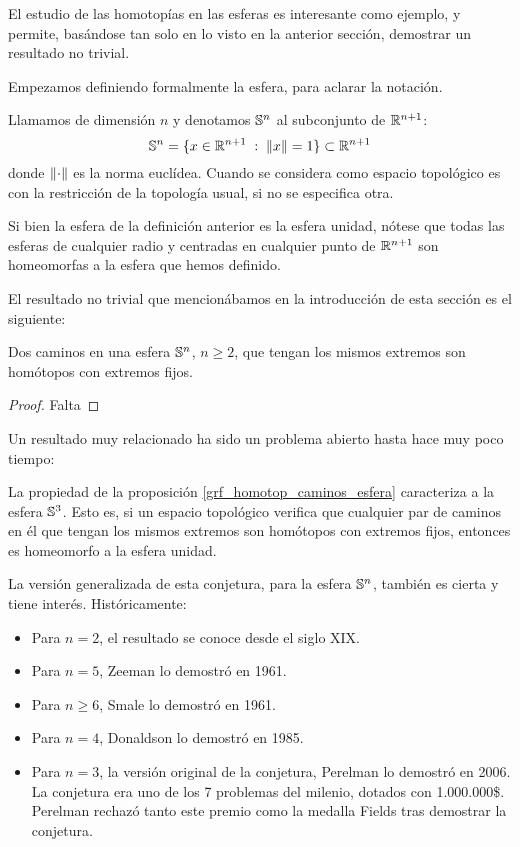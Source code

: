 El estudio de las homotopías en las esferas es interesante como ejemplo, y permite, basándose tan solo en lo visto en la anterior sección, demostrar un resultado no trivial.

Empezamos definiendo formalmente la esfera, para aclarar la notación.

\begin{defi}[Esfera]
	Llamamos  de dimensión $n$ y denotamos $\mathbb{S}^n$ al subconjunto de $\mathbb{R}^{n+1}$:
	\[\mathbb{S}^n = \{x\in\mathbb{R}^{n+1}\;:\; \lVert x\rVert=1\}\subset\mathbb{R}^{n+1}\]
	donde $\lVert\cdot\rVert$ es la norma euclídea. Cuando se considera como espacio topológico es con la restricción de la topología usual, si no se especifica otra.
\end{defi}

\begin{obs}
	Si bien la esfera de la definición anterior es la esfera unidad, nótese que todas las esferas de cualquier radio y centradas en cualquier punto de $\mathbb{R}^{n+1}$ son homeomorfas a la esfera que hemos definido.
\end{obs}

El resultado no trivial que mencionábamos en la introducción de esta sección es el siguiente:

\begin{prop}
	\label{grf_homotop_caminos_esfera}
	Dos caminos en una esfera $\mathbb{S}^n$, $n\geq 2$, que tengan los mismos extremos son homótopos con extremos fijos.

	\begin{proof}
		Falta
	\end{proof}
\end{prop}

Un resultado muy relacionado ha sido un problema abierto hasta hace muy poco tiempo:

\begin{conjet}[Poincaré]
	La propiedad de la proposición \ref{grf_homotop_caminos_esfera} caracteriza a la esfera $\mathbb{S}^3$. Esto es, si un espacio topológico verifica que cualquier par de caminos en él que tengan los mismos extremos son homótopos con extremos fijos, entonces es homeomorfo a la esfera unidad.
\end{conjet}

La versión generalizada de esta conjetura, para la esfera $\mathbb{S}^n$, también es cierta y tiene interés. Históricamente:
\begin{itemize}
	\item Para $n=2$, el resultado se conoce desde el siglo XIX.
	\item Para $n=5$, Zeeman lo demostró en 1961.
	\item Para $n\geq 6$, Smale lo demostró en 1961.
	\item Para $n=4$, Donaldson lo demostró en 1985.
	\item Para $n=3$, la versión original de la conjetura, Perelman lo demostró en 2006. La conjetura era uno de los 7 problemas del milenio, dotados con 1.000.000\$. Perelman rechazó tanto este premio como la medalla Fields tras demostrar la conjetura.
\end{itemize}